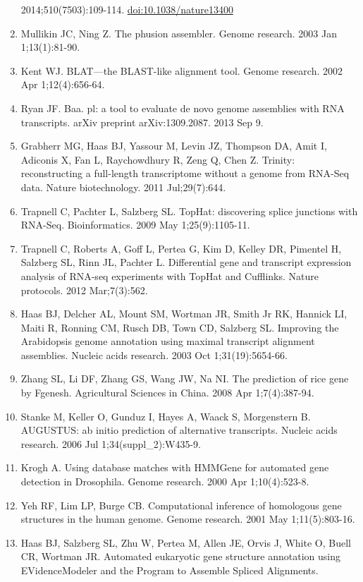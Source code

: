 \documentclass[
]{article}
\begin{document}
\begin{enumerate}
  2014;510(7503):109-114. \url{doi:10.1038/nature13400}
\item
  Mullikin JC, Ning Z. The phusion assembler. Genome research. 2003 Jan
  1;13(1):81-90.
\item
  Kent WJ. BLAT---the BLAST-like alignment tool. Genome research. 2002
  Apr 1;12(4):656-64.
\item
  Ryan JF. Baa. pl: a tool to evaluate de novo genome assemblies with
  RNA transcripts. arXiv preprint arXiv:1309.2087. 2013 Sep 9.
\item
  Grabherr MG, Haas BJ, Yassour M, Levin JZ, Thompson DA, Amit I,
  Adiconis X, Fan L, Raychowdhury R, Zeng Q, Chen Z. Trinity:
  reconstructing a full-length transcriptome without a genome from
  RNA-Seq data. Nature biotechnology. 2011 Jul;29(7):644.
\item
  Trapnell C, Pachter L, Salzberg SL. TopHat: discovering splice
  junctions with RNA-Seq. Bioinformatics. 2009 May 1;25(9):1105-11.
\item
  Trapnell C, Roberts A, Goff L, Pertea G, Kim D, Kelley DR, Pimentel H,
  Salzberg SL, Rinn JL, Pachter L. Differential gene and transcript
  expression analysis of RNA-seq experiments with TopHat and Cufflinks.
  Nature protocols. 2012 Mar;7(3):562.
\item
  Haas BJ, Delcher AL, Mount SM, Wortman JR, Smith Jr RK, Hannick LI,
  Maiti R, Ronning CM, Rusch DB, Town CD, Salzberg SL. Improving the
  Arabidopsis genome annotation using maximal transcript alignment
  assemblies. Nucleic acids research. 2003 Oct 1;31(19):5654-66.
\item
  Zhang SL, Li DF, Zhang GS, Wang JW, Na NI. The prediction of rice gene
  by Fgenesh. Agricultural Sciences in China. 2008 Apr 1;7(4):387-94.
\item
  Stanke M, Keller O, Gunduz I, Hayes A, Waack S, Morgenstern B.
  AUGUSTUS: ab initio prediction of alternative transcripts. Nucleic
  acids research. 2006 Jul 1;34(suppl\_2):W435-9.
\item
  Krogh A. Using database matches with HMMGene for automated gene
  detection in Drosophila. Genome research. 2000 Apr 1;10(4):523-8.
\item
  Yeh RF, Lim LP, Burge CB. Computational inference of homologous gene
  structures in the human genome. Genome research. 2001 May
  1;11(5):803-16.
\item
  Haas BJ, Salzberg SL, Zhu W, Pertea M, Allen JE, Orvis J, White O,
  Buell CR, Wortman JR. Automated eukaryotic gene structure annotation
  using EVidenceModeler and the Program to Assemble Spliced Alignments.

\end{enumerate}
\end{document}

